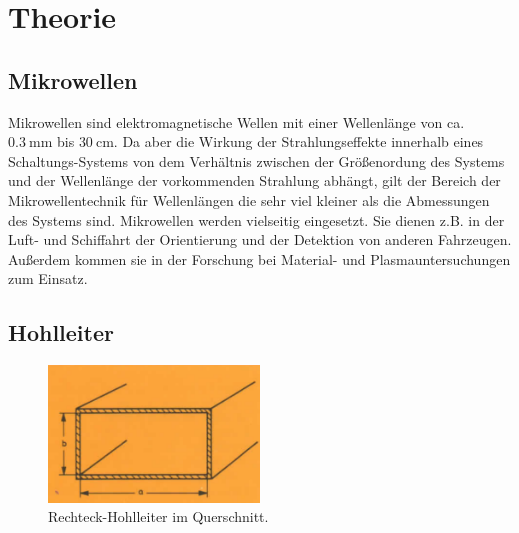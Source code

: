 \section{Theorie}
\label{sec:Theorie}



\subsection{Mikrowellen}

Mikrowellen sind elektromagnetische Wellen mit einer Wellenlänge von ca. $\SI{0.3}{\milli\m}$ bis $\SI{30}{\centi\m}$. Da aber die Wirkung der Strahlungseffekte innerhalb eines Schaltungs-Systems von dem Verhältnis zwischen der Größenordung des Systems und der Wellenlänge der vorkommenden Strahlung abhängt, gilt der Bereich der Mikrowellentechnik für Wellenlängen die sehr viel kleiner als die Abmessungen des Systems sind. Mikrowellen werden vielseitig eingesetzt. Sie dienen z.B. in der Luft- und Schiffahrt der Orientierung und der Detektion von anderen Fahrzeugen. Außerdem kommen sie in der Forschung bei Material- und Plasmauntersuchungen zum Einsatz. 

\subsection{Hohlleiter}


\begin{figure}
    \centering
    \includegraphics[width=0.5\textwidth]{Bilder/hohlleiter_querschnitt.PNG}
    \caption{Rechteck-Hohlleiter im Querschnitt.\cite{Mikrowellen}}
    \label{fig:hohlleiter}
\end{figure}




